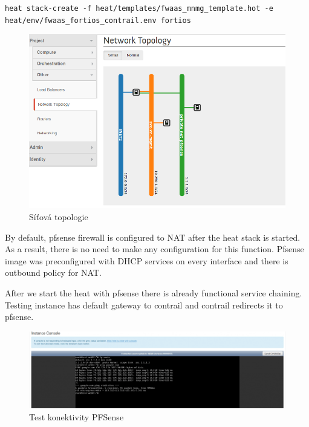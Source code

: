 \verb!heat stack-create -f heat/templates/fwaas_mnmg_template.hot -e heat/env/fwaas_fortios_contrail.env fortios!


\begin{figure}[h]
\begin{centering}
\includegraphics[scale=0.45]{images/fwaas_topologie}
\par\end{centering}
\caption{Síťová topologie\label{fig:fwaas_topologie}}
\end{figure}


By default, pfsense firewall is configured to NAT after the heat stack is started. As a result, there is no need to make any configuration for this function. Pfsense image was preconfigured with DHCP services on every interface and there is outbound policy for NAT.

After we start the heat with pfsense there is already functional service chaining. Testing instance has default gateway to contrail and contrail redirects it to pfsense.

\begin{figure}[h]
\begin{centering}
\includegraphics[scale=0.45]{images/pfsense_ping}
\par\end{centering}
\caption{Test konektivity PFSense\label{fig:pfsense_ping}}
\end{figure}

